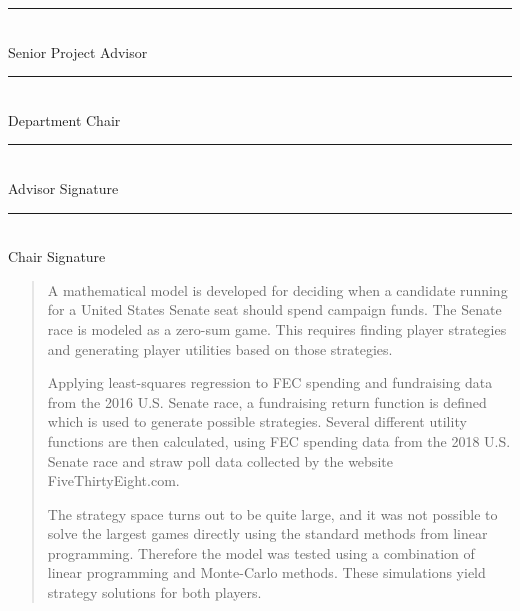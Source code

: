 \documentclass[11pt]{article}
\begin{document}
\begin{flushleft}
\begin{minipage}{37.5ex}
\begin{flushright}
\rule{37.5ex}{.1ex} \\
\hspace{5ex} Senior Project Advisor
\end{flushright}
\end{minipage}
\hfill
\begin{minipage}{37.5ex}
\begin{flushright}
\rule{37.5ex}{.1ex} \\
\hspace{5ex} Department Chair
\end{flushright}
\end{minipage}

\vspace{10ex}

\begin{minipage}{37.5ex}
\begin{flushright}
\rule{37.5ex}{.1ex} \\
\hspace{5ex} Advisor Signature
\end{flushright}
\end{minipage}
\hfill
\begin{minipage}{37.5ex}
\begin{flushright}
\rule{37.5ex}{.1ex} \\
\hspace{5ex} Chair Signature
\end{flushright}
\end{minipage}
\end{flushleft}

\vfill

\newpage

\begin{abstract}
A mathematical model is developed for deciding when a candidate running for a
United States Senate seat should spend campaign funds. The Senate race is modeled as a zero-sum game. This requires finding player strategies and generating player utilities based on those strategies.

Applying least-squares regression to FEC spending and fundraising data from
the 2016 U.S. Senate race, a fundraising return function is defined which is
used to generate possible strategies. Several different utility functions
are then calculated, using FEC spending data from the 2018 U.S. Senate race
and straw poll data collected by the website FiveThirtyEight.com.

The strategy space turns out to be quite large, and it was not possible to
solve the largest games directly using the standard methods from linear
programming. Therefore the model was tested using a combination of linear programming and Monte-Carlo methods. These simulations yield strategy solutions for both players.
\end{abstract}
\end{document}
